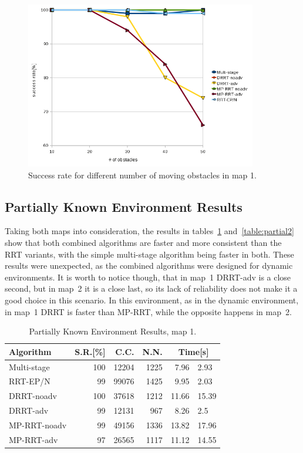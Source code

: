 \begin{figure}[h!]
\begin{center}
\includegraphics[width=0.9\textwidth]{images/success-rate}
\caption[Dynamic environment success rate]{Success rate for different number of moving obstacles in
map 1.}
\label{fig:success-rate}
\end{center}
\end{figure}

\subsection{Partially Known Environment Results}
Taking both maps into consideration, the results in tables~\ref{table:partial1}
and~\ref{table:partial2} 
show that both combined algorithms are faster and more consistent than the RRT
variants, with the simple multi-stage algorithm being faster in both. 
These results were unexpected, as the combined algorithms were designed
for dynamic environments.
It is
worth to notice though, that
in map~1 DRRT-adv is a close second, but in map~2 it is a close last, so its
lack of reliability does not make it a good choice in this scenario. In this
environment, as in the dynamic environment, in map~1 DRRT is faster than MP-RRT,
while the opposite happens in map~2.

\begin{table}[h!]
\caption{Partially Known Environment Results, map 1.}
\label{table:partial1}
\centering
\begin{tabular}{|l||r|r|r|r@{$\ \pm\ $}l|}
\hline
\textbf{Algorithm} & \textbf{S.R.[\%]} & \textbf{C.C.} & \textbf{N.N.} &
\multicolumn{2}{c|}{\textbf{Time[s]}}\\
\hline
Multi-stage & 100 & 12204 & 1225 & 7.96 & 2.93\\
\hline
RRT-EP/N & 99 & 99076 & 1425 & 9.95 & 2.03 \\
\hline
DRRT-noadv & 100 & 37618 & 1212 & 11.66 & 15.39\\
\hline
DRRT-adv & 99 & 12131 & 967 & 8.26 & 2.5\\
\hline
MP-RRT-noadv & 99 & 49156 & 1336 & 13.82 & 17.96\\
\hline
MP-RRT-adv & 97 & 26565 & 1117 & 11.12 & 14.55\\
\hline
\end{tabular}
\end{table}


